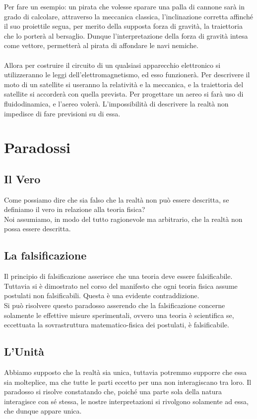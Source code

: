 \documentclass[]{article}
\begin{document}
	Per fare un esempio: un pirata che volesse sparare una palla di cannone sarà in grado di calcolare, attraverso la meccanica classica, l'inclinazione corretta affinché il suo proiettile segua, per merito della supposta forza di gravità, la traiettoria che lo porterà al bersaglio. Dunque l'interpretazione della forza di gravità intesa come vettore, permetterà al pirata di affondare le navi nemiche.   
	\\
	\\
	Allora per costruire il circuito di un qualsiasi apparecchio elettronico si utilizzeranno le leggi dell'elettromagnetismo, ed esso funzionerà. Per descrivere il moto di un satellite si useranno la relatività e la meccanica, e la traiettoria del satellite si accorderà con quella prevista. Per progettare un aereo si farà uso di fluidodinamica, e l'aereo volerà.  
	L'impossibilità di descrivere la realtà non impedisce di fare previsioni su di essa.
	\section{Paradossi}
	\subsection{Il Vero}
	Come possiamo dire che sia falso che la realtà non può essere descritta, se definiamo il vero in relazione alla teoria fisica?\\
	Noi assumiamo, in modo del tutto ragionevole ma arbitrario, che la realtà non possa essere descritta.
	\subsection{La falsificazione}
	Il principio di falsificazione asserisce che una teoria deve essere falsificabile. Tuttavia si è dimostrato nel corso del manifesto che ogni teoria fisica assume postulati non falsificabili. Questa è una evidente contraddizione.\\
	Si può risolvere questo paradosso asserendo che la falsificazione concerne solamente le effettive misure sperimentali, ovvero una teoria è scientifica se, eccettuata la sovrastruttura matematico-fisica dei postulati, è falsificabile.
	\subsection{L'Unità}
	Abbiamo supposto che la realtà sia unica, tuttavia potremmo supporre che essa sia molteplice, ma che tutte le parti eccetto per una non interagiscano tra loro.
	Il paradosso si risolve constatando che, poiché una parte sola della natura interagisce con sé stessa, le nostre interpretazioni si rivolgono solamente ad essa, che dunque appare unica.
\end{document}
